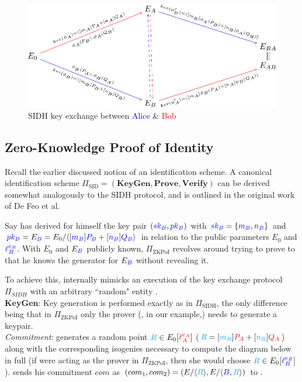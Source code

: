 \begin{figure}[htb]
\centering
\includegraphics[scale=0.5]{keyexchange.png} %
\caption{SIDH key exchange between \textcolor{blue}{Alice} \& \textcolor{red}{Bob} \cite{djp}}
\label{fig:kex} %
\end{figure}

\subsection{Zero-Knowledge Proof of Identity}

Recall the earlier discussed notion of an identification scheme. A canonical identification scheme $\Pi_{\text{SID}} = (\textbf{KeyGen},\textbf{Prove},\textbf{Verify})$ can be derived somewhat analogously to the SIDH protocol, and is outlined in the original work of De Feo et al.

Say \bob has derived for himself the key pair $(\textcolor{blue}{sk_B},\textcolor{blue}{pk_B})$ with $\textcolor{blue}{sk_B} = \{\textcolor{blue}{m_B},\textcolor{blue}{n_B}\}$ and $\textcolor{blue}{pk_B} = E_{\textcolor{blue}{B}} = E_0/\langle [\textcolor{blue}{m_B}]\textcolor{blue}{P_B} + [\textcolor{blue}{n_B}]\textcolor{blue}{Q_B} \rangle$ in relation to the public parameters $E_0$ and $\textcolor{blue}{\ell_{B}^{e_B}}$. With $E_0$ and $E_{\textcolor{blue}{B}}$ publicly known, $\Pi_{\text{ZKPoI}}$ revolves around \bob trying to prove to \alice that he knows the generator for $E_{\textcolor{blue}{B}}$ without revealing it.

To achieve this, \bob internally mimicks an execution of the key exchange protocol $\Pi_{SIDH}$ with an arbitrary ``random" entity \randall.\\

\noindent
\textbf{KeyGen}: Key generation is performed exactly as in $\Pi_{\text{SIDH}}$, the only difference being that in $\Pi_{\text{ZKPoI}}$ only the prover (\bob, in our example,) needs to generate a keypair.\\

\noindent
\emph{Commitment}: \bob generates a random point $\textcolor{cyan}{R} \in E_0[\textcolor{red}{\ell_{A}^{e_A}}]$ ($\textcolor{cyan}{R} = [\textcolor{cyan}{m_R}]\textcolor{red}{P_A} + [\textcolor{cyan}{n_R}]\textcolor{red}{Q_A}$) along with the corresponding isogenies necessary to compute the diagram below in full (if \alice were acting as the prover in $\Pi_{\text{ZKPoI}}$, then she would choose $\textcolor{cyan}{R} \in E_0[\textcolor{blue}{\ell_{B}^{e_B}}]$). \bob sends his commitment $com$ as $(com_1,com_2) = (E/\langle \textcolor{cyan}{R} \rangle, E/\langle \textcolor{blue}{B}, \textcolor{cyan}{R} \rangle)$ to \alice.\\

